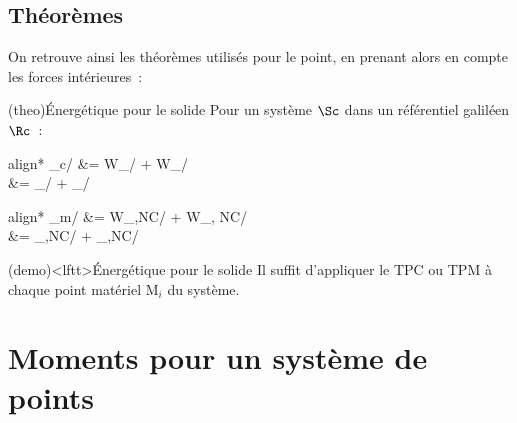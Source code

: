 \documentclass[../../main/main.tex]{subfiles}
\begin{document}
\subsection{Théorèmes}
On retrouve ainsi les théorèmes utilisés pour le point, en prenant alors en
compte les forces intérieures~:
\begin{tcb*}(theo){Énergétique pour le solide}
	Pour un système $\Sc$ dans un référentiel galiléen $\Rc$~: \smallbreak
	\begin{isd}
		\begin{center}
		\end{center}
		\begin{empheq}[box=\fbox]{align*}
			\D\Ec_{c/\Rc} &= W_{\ext/\Rc} + W_{\rint/\Rc}\\
			 &= \Pc_{\ext/\Rc} + \Pc_{\rint/\Rc}
		\end{empheq}
		\tcblower
		\begin{center}
			\tcbsubtitle{\fatbox{\textbf{TEM, TPM}}}
		\end{center}
		\begin{empheq}[box=\fbox]{align*}
			\D\Ec_{m/\Rc} &= W_{\ext,NC/\Rc} + W_{\rint, NC/\Rc}\\
			 &= \Pc_{\ext,NC/\Rc} + \Pc_{\rint,NC/\Rc}
		\end{empheq}
	\end{isd}
\end{tcb*}

\begin{tcb*}(demo)<lftt>{Énergétique pour le solide}
	Il suffit d'appliquer le TPC ou TPM à chaque point matériel M$_i$ du
	système.
\end{tcb*}

\section{Moments pour un système de points}
\end{document}

